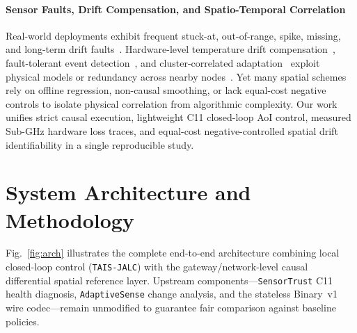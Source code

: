 \documentclass[journal,twoside,web]{ieeecolor}
\begin{document}
\paragraph{Sensor Faults, Drift Compensation, and Spatio-Temporal Correlation}
Real-world deployments exhibit frequent stuck-at, out-of-range, spike, missing, and long-term drift faults~\cite{sharma2010faults,ni2009sensor,chai2022stability}. Hardware-level temperature drift compensation~\cite{wang2022drift}, fault-tolerant event detection~\cite{yim2010fault}, and cluster-correlated adaptation~\cite{harb2024clara} exploit physical models or redundancy across nearby nodes~\cite{vuran2004spatiotemporal,guestrin2004distributed}. Yet many spatial schemes rely on offline regression, non-causal smoothing, or lack equal-cost negative controls to isolate physical correlation from algorithmic complexity. Our work unifies strict causal execution, lightweight C11 closed-loop AoI control, measured Sub-GHz hardware loss traces, and equal-cost negative-controlled spatial drift identifiability in a single reproducible study.

\section{System Architecture and Methodology}

Fig.~\ref{fig:arch} illustrates the complete end-to-end architecture combining local closed-loop control (\texttt{TAIS-JALC}) with the gateway/network-level causal differential spatial reference layer. Upstream components---\texttt{SensorTrust} C11 health diagnosis, \texttt{AdaptiveSense} change analysis, and the stateless Binary~v1 wire codec---remain unmodified to guarantee fair comparison against baseline policies.
\end{document}
